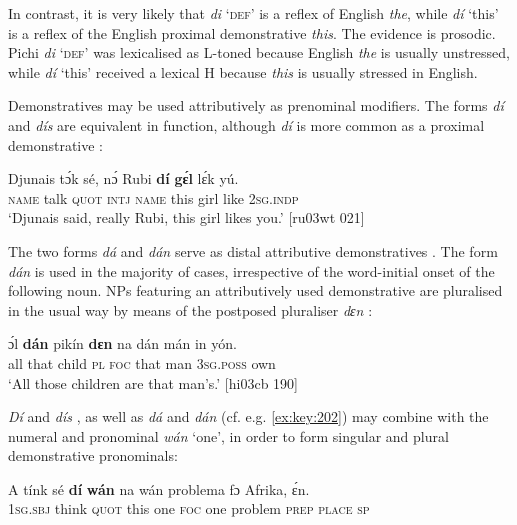 In contrast, it is very likely that \textit{di} ‘\textsc{def}’ is a reflex of English \textit{the}, while \textit{dí} ‘this’ is a reflex of the English proximal demonstrative \textit{this}. The evidence is prosodic. Pichi \textit{di} ‘\textsc{def}’ was lexicalised as L-toned because English \textit{the} is usually unstressed, while \textit{dí} ‘this’ received a lexical H because \textit{this} is usually stressed in English. 



Demonstratives may be used attributively as prenominal modifiers. The forms \textit{dí} and \textit{dís} are equivalent in function, although \textit{dí} is more common as a proximal demonstrative :



\ea%
    \label{ex:key:192}
    \gll Djunais  tɔ́k  sé,    nɔ́  Rubi    \textbf{dí}  \textbf{gɛ́l}  lɛ́k  yú.\\
\textsc{name}  talk  \textsc{quot}    \textsc{intj}  \textsc{name}  this  girl  like  \textsc{2sg.indp}\\

\glt ‘Djunais said, really Rubi, this girl likes you.’ [ru03wt 021]
\z

The two forms \textit{dá} and \textit{dán} serve as distal attributive demonstratives . The form \textit{dán} is used in the majority of cases, irrespective of the word-initial onset of the following noun. NPs featuring an attributively used demonstrative are pluralised in the usual way by means of the postposed pluraliser \textit{dɛn} :


\ea%
    \label{ex:key:193}
    \gll ɔ́l  \textbf{dán}  pikín  \textbf{dɛn}  na  dán  mán    in    yón.\\
all  that  child  \textsc{pl}  \textsc{foc}  that  man    \textsc{3sg.poss}  own\\

\glt ‘All those children are that man’s.’ [hi03cb 190]
\z

\textit{Dí} and \textit{dís} , as well as \textit{dá} and \textit{dán} (cf. e.g. \ref{ex:key:202}) may combine with the numeral and pronominal \textit{wán} ‘one’, in order to form singular  and plural  demonstrative pronominals:


\ea%
    \label{ex:key:194}
    \gll A    tínk    sé    \textbf{dí}  \textbf{wán}  na  wán  problema  fɔ  Afrika,  ɛ́n.\\
\textsc{1sg.sbj}  think  \textsc{quot}    this  one  \textsc{foc}  one  problem    \textsc{prep}  \textsc{place}  \textsc{sp}\\

